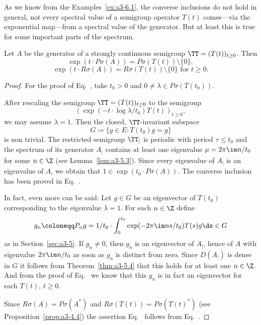 As we know from the Examples~\ref{ex:a3-6.1}, the converse inclusions do not hold in general, \ie not every spectral value of a semigroup operator $T(t)$ comes---via the exponential map---from a spectral value of the generator.
But at least this is true for some important parts of the spectrum.
\begin{theorem}\label{thm:a3-6.3}%
Let $A$ be the generator of a strongly continuous semigroup $\TT = (T(t))_{t \geq 0}$.
Then
\begin{equation}\label{eq:a3-6.4}
\exp(t \cdot P\sigma(A)) = P\sigma(T(t)) \setminus \{0\} ,
\end{equation}
\begin{equation}\label{eq:a3-6.5}
\exp(t \cdot R\sigma(A)) = R\sigma(T(t)) \setminus \{0\} \text{ for } t \geq 0 .
\end{equation}
\end{theorem}
\begin{proof}
For the proof of Eq.~,  take $t_{0} > 0$ and $0 \neq \lambda \in P\sigma(T(t_{0}))$.

After rescaling the semigroup $\TT = (T(t))_{t \geq 0}$ to the semigroup
\[
(\exp(-t \cdot \log\lambda/t_{0})T(t))_{t \geq 0} ,
\]
we may assume $\lambda = 1$. 
Then the closed, $\TT$-invariant subspace
\[
G \coloneqq \{g \in E \colon T(t_{0})g = g\}
\]
is non trivial.
The restricted semigroup $\TT_{|}$ is periodic with period $\tau \leq t_{0}$ and the spectrum of its generator $A_{|}$ contains at least one eigenvalue $\mu = 2\pi\im n/t_{0}$ for some $n \in \Z$ (see Lemma~\ref{lem:a3-5.3}).
Since every eigenvalue of\/ $A_{|}$ is an eigenvalue of\/ $A$, we obtain that $1 \in \exp(t_{0} \cdot P\sigma(A))$.
The converse inclusion has been proved in Eq.~.

In fact, even more can be said: Let $g \in G$ be an eigenvector of\/ $T(t_{0})$ corresponding to the eigenvalue $\lambda = 1$.
For each $n \in \Z$ define
\[
g_{n} \coloneqq P_{n}g = 1/t_{0} \cdot \int_{0}^{t_{0}} \exp(-2\pi\im ns/t_{0})T(s)g  \ds \in G
\]
as in Section~\ref{sec:a3-5}.
If\/ $g_{n} \ne 0$, then $g_{n}$ is an eigenvector of\/ $A_{|}$, hence of\/ $A$ with eigenvalue $2\pi\im n/t_{0}$ as soon as $g_{n}$ is distinct from zero.
Since $D(A_{|})$ is dense in $G$ it follows from Theorem~\ref{thm:a3-5.4} that this holds for at least one $n \in \Z$.
And from the proof of Eq.~ we know that this $g_{n}$ is in fact an eigenvector for each $T(t)$, $t \geq 0$.

Since $R\sigma(A) = P\sigma(A^{*})$ and $R\sigma(T(t)) = P\sigma(T(t)^{*})$ (see Proposition~\ref{prop:a3-4.4}) the assertion Eq.~  follows from Eq.~.
\end{proof}
